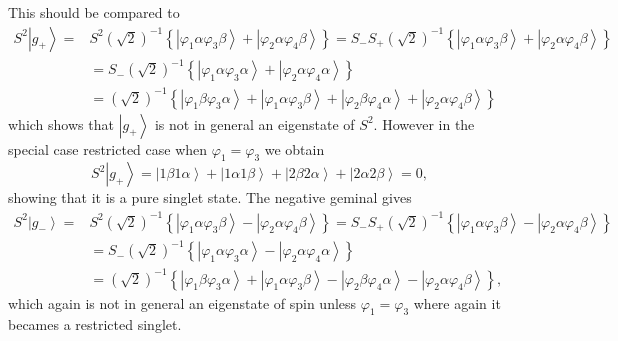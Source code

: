 \documentclass[aps,preprint]{revtex4}%
\begin{document}
This should be compared to%
\begin{align*}
S^{2}\left\vert g_{+}\right\rangle =  &  S^{2}\left(  \sqrt{2}\right)
^{-1}\left\{  \left\vert \varphi_{1}\alpha\varphi_{3}\beta\right\rangle
+\left\vert \varphi_{2}\alpha\varphi_{4}\beta\right\rangle \right\}
=S_{-}S_{+}\left(  \sqrt{2}\right)  ^{-1}\left\{  \left\vert \varphi_{1}%
\alpha\varphi_{3}\beta\right\rangle +\left\vert \varphi_{2}\alpha\varphi
_{4}\beta\right\rangle \right\} \\
&  =S_{-}\left(  \sqrt{2}\right)  ^{-1}\left\{  \left\vert \varphi_{1}%
\alpha\varphi_{3}\alpha\right\rangle +\left\vert \varphi_{2}\alpha\varphi
_{4}\alpha\right\rangle \right\} \\
&  =\left(  \sqrt{2}\right)  ^{-1}\left\{  \left\vert \varphi_{1}\beta
\varphi_{3}\alpha\right\rangle +\left\vert \varphi_{1}\alpha\varphi_{3}%
\beta\right\rangle +\left\vert \varphi_{2}\beta\varphi_{4}\alpha\right\rangle
+\left\vert \varphi_{2}\alpha\varphi_{4}\beta\right\rangle \right\}
\end{align*}
which shows that $\left\vert g_{+}\right\rangle $ is not in general an
eigenstate of $S^{2}$. However in the special case restricted case when
$\varphi_{1}=\varphi_{3}$ we obtain
\[
S^{2}\left\vert g_{+}\right\rangle =\left\vert 1\beta1\alpha\right\rangle
+\left\vert 1\alpha1\beta\right\rangle +\left\vert 2\beta2\alpha\right\rangle
+\left\vert 2\alpha2\beta\right\rangle =0,
\]
showing that it is a pure singlet state. The negative geminal gives
\begin{align*}
S^{2}\left\vert g_{-}\right\rangle =  &  S^{2}\left(  \sqrt{2}\right)
^{-1}\left\{  \left\vert \varphi_{1}\alpha\varphi_{3}\beta\right\rangle
-\left\vert \varphi_{2}\alpha\varphi_{4}\beta\right\rangle \right\}
=S_{-}S_{+}\left(  \sqrt{2}\right)  ^{-1}\left\{  \left\vert \varphi_{1}%
\alpha\varphi_{3}\beta\right\rangle -\left\vert \varphi_{2}\alpha\varphi
_{4}\beta\right\rangle \right\} \\
&  =S_{-}\left(  \sqrt{2}\right)  ^{-1}\left\{  \left\vert \varphi_{1}%
\alpha\varphi_{3}\alpha\right\rangle -\left\vert \varphi_{2}\alpha\varphi
_{4}\alpha\right\rangle \right\} \\
&  =\left(  \sqrt{2}\right)  ^{-1}\left\{  \left\vert \varphi_{1}\beta
\varphi_{3}\alpha\right\rangle +\left\vert \varphi_{1}\alpha\varphi_{3}%
\beta\right\rangle -\left\vert \varphi_{2}\beta\varphi_{4}\alpha\right\rangle
-\left\vert \varphi_{2}\alpha\varphi_{4}\beta\right\rangle \right\}  ,
\end{align*}
which again is not in general an eigenstate of spin unless $\varphi
_{1}=\varphi_{3}$ where again it becames a restricted singlet.
\end{document}
